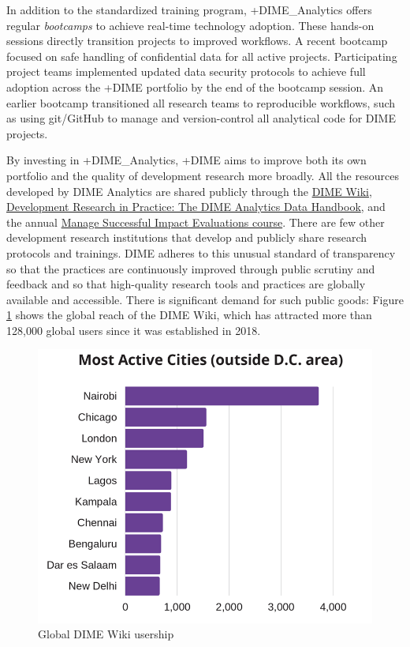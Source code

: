 \documentclass[
]{book}
\begin{document}
In addition to the standardized training program, +DIME\_Analytics\textbar{} offers regular \emph{bootcamps} to achieve real-time technology adoption. These hands-on sessions directly transition projects to improved workflows. A recent bootcamp focused on safe handling of confidential data for all active projects. Participating project teams implemented updated data security protocols to achieve full adoption across the +DIME\textbar{} portfolio by the end of the bootcamp session. An earlier bootcamp transitioned all research teams to reproducible workflows, such as using git/GitHub to manage and version-control all analytical code for DIME projects.

By investing in +DIME\_Analytics\textbar, +DIME\textbar{} aims to improve both its own portfolio and the quality of development research more broadly. All the resources developed by DIME Analytics are shared publicly through the \href{https://dimewiki.worldbank.org/}{DIME Wiki}, \href{https://worldbank.github.io/dime-data-handbook/}{Development Research in Practice: The DIME Analytics Data Handbook}, and the annual \href{https://www.worldbank.org/en/events/2019/06/10/manage-successful-impact-evaluations}{Manage Successful Impact Evaluations course}. There are few other development research institutions that develop and publicly share research protocols and trainings. DIME adheres to this unusual standard of transparency so that the practices are continuously improved through public scrutiny and feedback and so that high-quality research tools and practices are globally available and accessible. There is significant demand for such public goods: Figure \ref{fig:dimefigure4} shows the global reach of the DIME Wiki, which has attracted more than 128,000 global users since it was established in 2018.

\begin{figure}
\includegraphics[width=1\linewidth]{./assets/dime/dimefigure4web} \caption{Global DIME Wiki usership}\label{fig:dimefigure4}
\end{figure}
\end{document}
